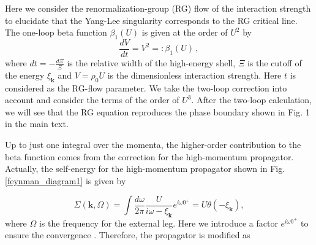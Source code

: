 \documentclass[aps,prl,twocolumn,superscriptaddress]{revtex4-1}
\begin{document}
\begin{bibunit}
Here we consider the renormalization-group (RG) flow of the interaction strength to elucidate that the Yang-Lee singularity corresponds to the RG critical line. The one-loop beta function $\beta_1(U)$ is given at the order of $U^2$ by \cite{Shankar1994,Nagaosa}
\begin{equation}
	\frac{dV}{dt}=V^{2}=:\beta_1(U)\,,
	\label{one-loop}
\end{equation}
where $dt=-\frac{d\Xi}{\Xi}$ is the relative width of the high-energy
shell, $\Xi$ is the cutoff of the energy $\xi_{\bm{k}}$ and $V=\rho_0 U$ is the dimensionless interaction strength. Here $t$ is considered as the RG-flow parameter. We take the two-loop correction into account and consider the terms of the order of $U^3$. After the two-loop calculation, we will see that the RG equation reproduces the phase boundary shown in Fig. 1 in the main text.

Up to just one integral over the momenta, the higher-order contribution
to the beta function comes from the correction for the high-momentum propagator.
Actually, the self-energy for the high-momentum
propagator shown in Fig. \ref{feynman_diagram1} is given by

\begin{equation}
	\Sigma(\bm{k},\Omega)=\int\frac{d\omega}{2\pi}\frac{U}{i\omega-\xi_{\bm{k}}}e^{i\omega0^+}=U\theta(-\xi_{\bm{k}}),
\end{equation}
where $\Omega$ is the frequency for the external leg. Here we introduce a factor $e^{i\omega0^+}$ to ensure the convergence \cite{Shankar1994}. Therefore, the propagator is modified as


\end{bibunit}
\end{document}
